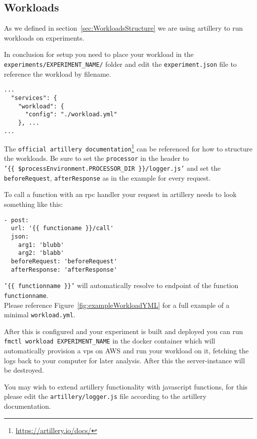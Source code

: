 \documentclass[../main.tex]{subfiles}
\begin{document}
\subsection{Workloads}\label{sec:WorkloadsUsage}

As we defined in section~\ref{sec:WorkloadsStructure} we are using artillery to run workloads on experiments. 

In conclusion for setup you need to place your workload in the \\
\texttt{experiments/EXPERIMENT\_NAME/} 
folder and edit the \texttt{experiment.json} file to reference the workload by filename.

\begin{tcolorbox}[titleDetachedStyle, title=\texttt{experiment.json}]
\begin{verbatim}
...
  "services": {
    "workload": {
      "config": "./workload.yml"
    }, ...
...
\end{verbatim}
\end{tcolorbox}

The \texttt{official artillery documentation}\footnote{\url{https://artillery.io/docs/}} can be referenced for how to structure the workloads. Be sure to set the \texttt{processor} in the header to \\\texttt{'\{\{ \$processEnvironment.PROCESSOR\_DIR \}\}/logger.js'} and set the \texttt{beforeRequest}, \texttt{afterResponse} as in the example  for every request. 



To call a function with an rpc handler your request in artillery needs to look something like this:

\begin{tcolorbox}[titleDetachedStyle, title=\texttt{workload.yml}]
\begin{verbatim}
- post:
  url: '{{ functioname }}/call'
  json:
    arg1: 'blubb' 
    arg2: 'blabb'
  beforeRequest: 'beforeRequest'
  afterResponse: 'afterResponse'
\end{verbatim}
\end{tcolorbox}

\texttt{'\{\{ functionname \}\}'} will automatically resolve to endpoint of the function \texttt{functionname}. \\
Please reference Figure~\ref{fig:exampleWorkloadYML} for a full example of a minimal \texttt{workload.yml}.

After this is configured and your experiment is built and deployed you can run \texttt{fmctl workload EXPERIMENT\_NAME} in the docker container which will automatically provision a vps on AWS and run your workload on it, fetching the logs back to your computer for later analysis. After this the server-instance will be destroyed.

You may wish to extend artillery functionality with javascript functions, for this please edit the \texttt{artillery/logger.js} file according to the artillery documentation.
\end{document}
